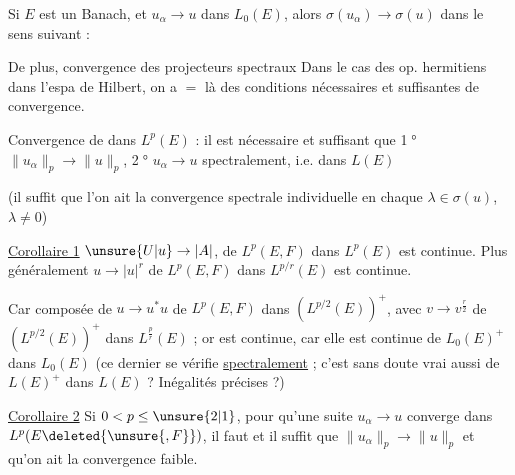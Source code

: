 
Si $E$ est un Banach, et $u_\alpha\to u$ dans $L_0(E)$, alors $\sigma(u_\alpha)\to\sigma(u)$ dans le sens suivant :

De plus, convergence des projecteurs spectraux  Dans le cas des op. hermitiens dans l'espa de Hilbert, on a $=$ là des conditions nécessaires et suffisantes de convergence.

Convergence de   dans $L^p(E)$ : il est nécessaire et suffisant que \textcircled{\scriptsize 1°} $\|u_\alpha\|_p\to\|u\|_p$, \textcircled{\scriptsize 2°} $u_\alpha\to u$ spectralement, i.e. dans $L(E)$

(il suffit  que l'on ait la convergence spectrale individuelle en chaque $\lambda\in\sigma(u)$, $\lambda\neq0$)

\uline{Corollaire 1} $\unsure{U|u}\to|A|$, de $L^p(E,F)$ dans $L^p(E)$ est continue. Plus généralement $u\to|u|^r$ de $L^p(E,F)$ dans $L^{p/r}(E)$ est continue.

Car composée de $u\to u^*u$ de $L^p(E,F)$ dans $(L^{p/2}(E))^+$, avec $v\to v^{\frac r2}$ de $(L^{p/2}(E))^+$ dans $L^{\frac pr}(E)$ ; or   est continue, car elle est continue de $L_0(E)^+$ dans $L_0(E)$ (ce dernier  se vérifie \uline{spectralement} ; c'est sans doute vrai aussi de $L(E)^+$ dans $L(E)$ ? Inégalités précises ?)

\uline{Corollaire 2} Si $0<p\leq\unsure{2|1}$, pour qu'une suite  $u_\alpha\to u$ converge dans $L^p(E\deleted{\unsure{,F}})$, il faut et il suffit que $\|u_\alpha\|_p\to\|u\|_p$ et qu'on ait la convergence faible.
